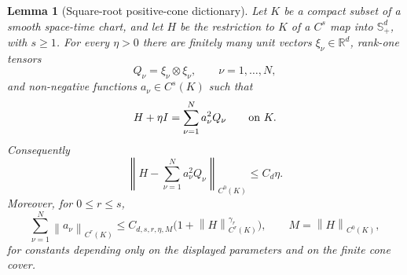 \documentclass[11pt]{article}
\numberwithin{equation}{section}
\newtheorem{lemma}[theorem]{Lemma}
\newcommand{\Sym}{\mathbb S}
\newcommand{\norm}[1]{\left\lVert #1\right\rVert}
\begin{document}
\begin{lemma}[Square-root positive-cone dictionary]
\label{lem:sqrt-cone-dictionary}
Let \(K\) be a compact subset of a smooth space-time chart, and let
\(H\) be the restriction to \(K\) of a \(C^s\) map into \(\Sym^d_+\), with
\(s\ge1\).  For every \(\eta>0\) there are finitely many unit vectors
\(\xi_\nu\in\mathbb R^d\), rank-one tensors
\[
  Q_\nu=\xi_\nu\otimes\xi_\nu,
  \qquad \nu=1,\ldots,N,
\]
and non-negative functions \(a_\nu\in C^s(K)\) such that
\begin{equation}
  H+\eta I=\sum_{\nu=1}^N a_\nu^2 Q_\nu
  \qquad\hbox{on }K .
  \label{eq:sqrt-cone-dictionary}
\end{equation}
Consequently
\[
  \left\|H-\sum_{\nu=1}^N a_\nu^2Q_\nu\right\|_{C^0(K)}
  \le C_d\eta .
\]
Moreover, for \(0\le r\le s\),
\begin{equation}
  \sum_{\nu=1}^N \norm{a_\nu}_{C^r(K)}
  \le
  C_{d,s,r,\eta,M}\bigl(1+\norm{H}_{C^r(K)}^{\gamma_r}\bigr),
  \qquad
  M=\norm{H}_{C^0(K)} ,
  \label{eq:sqrt-cone-derivative-bound}
\end{equation}
for constants depending only on the displayed parameters and on the finite
cone cover.
\end{lemma}
\end{document}
